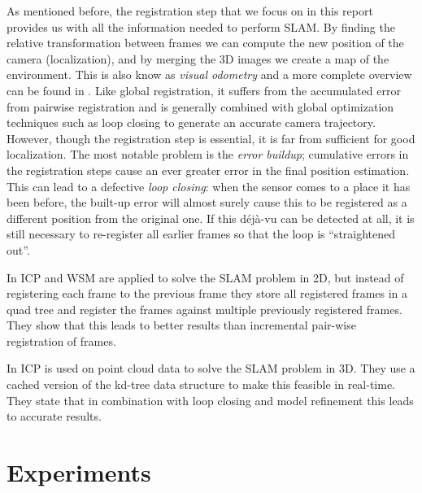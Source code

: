 \documentclass[a4paper]{article}
\begin{document}
As mentioned before, the registration step that we focus on in this report provides us with all the information needed to perform \ac{SLAM}. By finding the relative transformation between frames we can compute the new position of the camera (localization), and by merging the 3D images we create a map of the environment. This is also know as \emph{visual odometry} and a more complete overview can be found in \cite{scaramuzzavisual,fraundorfervisual}. Like global registration, it suffers from the accumulated error from pairwise registration and is generally combined with global optimization techniques such as loop closing to generate an accurate camera trajectory. However, though the registration step is essential, it is far from sufficient for good localization. The most notable problem is the \emph{error buildup}; cumulative errors in the registration steps cause an ever greater error in the final position estimation. This can lead to a defective \emph{loop closing}: when the sensor comes to a place it has been before, the built-up error will almost surely cause this to be registered as a different position from the original one. If this d\'ej\`a-vu can be detected at all, it is still necessary to re-register all earlier frames so that the loop is ``straightened out''.


In \cite{slamet2008boosting} \ac{ICP} and \ac{WSM} are applied to solve the \ac{SLAM} problem in 2D, but instead of registering each frame to the previous frame they store all registered frames in a quad tree and register the frames against multiple previously registered frames. They show that this leads to better results than incremental pair-wise registration of frames.

In \cite{nuchter20076d} \ac{ICP} is used on point cloud data to solve the \ac{SLAM} problem in 3D. They use a cached version of the kd-tree data structure to make this feasible in real-time. They state that in combination with loop closing and model refinement this leads to accurate results.

\section{Experiments}
\end{document}
